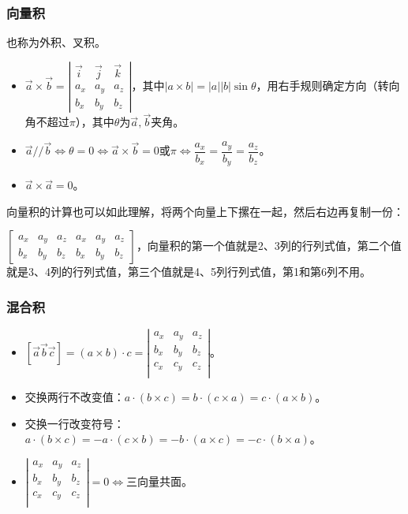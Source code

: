 \documentclass[UTF8, 12pt]{ctexart}
\begin{document}
\subsubsection{向量积}

也称为外积、叉积。

\begin{itemize}
    \item $\vec{a}\times\vec{b}=\left\vert\begin{array}{ccc}
        \vec{i} & \vec{j} & \vec{k} \\
        a_x & a_y & a_z \\
        b_x & b_y & b_z
    \end{array}\right\vert$，其中$\vert a\times b\vert=\vert a\vert\vert b\vert\sin\theta$，用右手规则确定方向（转向角不超过$\pi$），其中$\theta$为$\vec{a},\vec{b}$夹角。
    \item $\vec{a}//\vec{b}\Leftrightarrow\theta=0\Leftrightarrow\vec{a}\times\vec{b}=0$或$\pi\Leftrightarrow\dfrac{a_x}{b_x}=\dfrac{a_y}{b_y}=\dfrac{a_z}{b_z}$。
    \item $\vec{a}\times\vec{a}=0$。
\end{itemize}

向量积的计算也可以如此理解，将两个向量上下摞在一起，然后右边再复制一份：

$\left[\begin{array}{cccccc}
    a_x & a_y & a_z & a_x & a_y & a_z \\
    b_x & b_y & b_z & b_x & b_y & b_z
\end{array}\right]$，向量积的第一个值就是2、3列的行列式值，第二个值就是3、4列的行列式值，第三个值就是4、5列行列式值，第1和第6列不用。

\subsubsection{混合积}

\begin{itemize}
    \item $[\vec{a}\vec{b}\vec{c}]=(a\times b)\cdot c=\left\vert\begin{array}{ccc}
        a_x & a_y & a_z \\
        b_x & b_y & b_z \\
        c_x & c_y & c_z \\
    \end{array}\right\vert$。
    \item 交换两行不改变值：$a\cdot(b\times c)=b\cdot(c\times a)=c\cdot(a\times b)$。
    \item 交换一行改变符号：$a\cdot(b\times c)=-a\cdot(c\times b)=-b\cdot(a\times c)=-c\cdot(b\times a)$。
    \item $\left\vert\begin{array}{ccc}
        a_x & a_y & a_z \\
        b_x & b_y & b_z \\
        c_x & c_y & c_z \\
    \end{array}\right\vert=0\Leftrightarrow$三向量共面。
\end{itemize}
\end{document}
